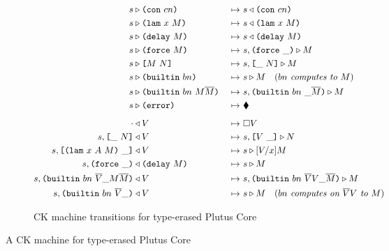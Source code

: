 \documentclass[../plutus-core-specification.tex]{subfiles}
\begin{document}
\begin{figure}[H]
\ContinuedFloat
  \begin{subfigure}[c]{\linewidth}

    \begin{minipage}{\linewidth}
\begin{alignat*}{2}
  s & \compute \con{cn}                          &~\mapsto~& s \return \con{cn}\\
  s & \compute \lamU{x}{M}                       &~\mapsto~& s \return \lamU{x}{M}\\
  s & \compute \delay{M}                         &~\mapsto~& s \return \delay{M}\\
  s & \compute \force{M}                         &~\mapsto~& s,\inForceFrame{} \compute M \\
  s & \compute \appU{M}{N}                       &~\mapsto~& s,\inAppLeftFrame{N} \compute M\\
  s & \compute \builtinU{bn}{\!\!}               &~\mapsto~& s \compute M
                                                 \quad (\textit{$bn$ computes to $M$}) \\
  s & \compute \builtinU{bn}{M \repetition{M}}   &~\mapsto~& s,\inBuiltinU{bn}{}{\_}{\repetition{M}} \compute M\\
  s & \compute \errorU                           &~\mapsto~& \ckerror{}\\
  \\[-10pt] %
  \cdot & \return V                              &~\mapsto~& \square V\\
  s,\inAppLeftFrame{N} & \return V               &~\mapsto~& s,\inAppRightFrame{V} \compute N\\
  s,\inAppRightFrame{\lam{x}{A}{M}} & \return V  &~\mapsto~& s \compute \subst{V}{x}{M}\\
  s,\inForceFrame{} & \return \delay{M}          &~\mapsto~& s \compute M\\
  s,\inBuiltinU{bn}{\repetition{V}}{\_}{M \repetition{M}} & \return V
                                                 &~\mapsto~& s,\inBuiltinU{bn}{\repetition{V} V}{\_}{\repetition{M}}
                                                 \compute M\\
  s,\inBuiltinU{bn}{\repetition{V}}{\_}{} & \return V
                                                 &~\mapsto~&  s \compute M
                                                 \quad (\textit{$bn$ computes on $\repetition{V}V$ to $M$})\\
    \end{alignat*}
\end{minipage}
    \caption{CK machine transitions for type-erased Plutus Core}
    \label{fig:untyped-ck-transitions}
\end{subfigure}
\caption{A CK machine for type-erased Plutus Core}
\label{fig:untyped-ck-machine}
\end{figure}
\end{document}
